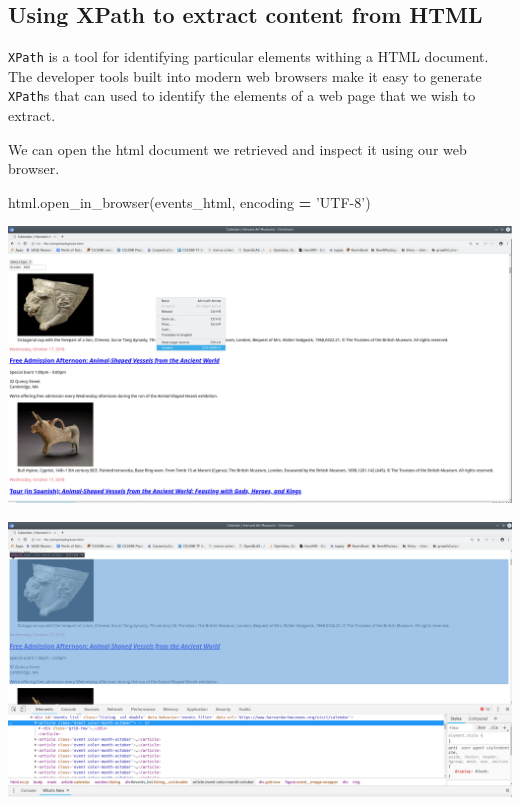 \documentclass[]{book}
\newenvironment{Shaded}{\begin{snugshade}}{\end{snugshade}}
\newcommand{\NormalTok}[1]{#1}
\newcommand{\OperatorTok}[1]{\textcolor[rgb]{0.81,0.36,0.00}{\textbf{#1}}}
\newcommand{\StringTok}[1]{\textcolor[rgb]{0.31,0.60,0.02}{#1}}
\begin{document}
\hypertarget{using-xpath-to-extract-content-from-html}{%
\subsection{Using XPath to extract content from HTML}\label{using-xpath-to-extract-content-from-html}}

\texttt{XPath} is a tool for identifying particular elements withing a HTML
document. The developer tools built into modern web browsers make it
easy to generate \texttt{XPath}s that can used to identify the elements of a
web page that we wish to extract.

We can open the html document we retrieved and inspect it using
our web browser.

\begin{Shaded}
\begin{Highlighting}[]
\NormalTok{html.open_in_browser(events_html, encoding }\OperatorTok{=} \StringTok{'UTF-8'}\NormalTok{)}
\end{Highlighting}
\end{Shaded}

\includegraphics{Python/PythonWebScrape/images/dev_tools_right_click.png}

\includegraphics{Python/PythonWebScrape/images/dev_tools_inspect.png}
\end{document}
